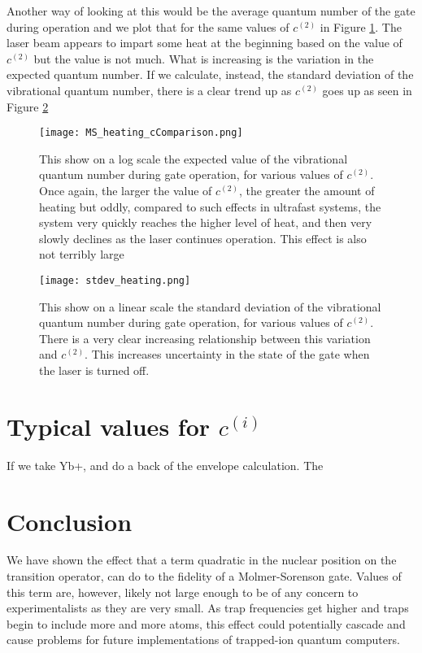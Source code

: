 Another way of looking at this would be the average quantum number of the gate during operation and we plot that for the same values of  $c^{(2)}$ in Figure \ref{fig:MS_heating_cComparison}.  The laser beam appears to impart some heat at the beginning based on the value of $c^{(2)}$ but the value is not much.  What is increasing is the variation in the expected quantum number.  If we calculate, instead, the standard deviation of the vibrational quantum number, there is a clear trend up as $c^{(2)}$ goes up as seen in Figure \ref{fig:MS_heating_stdev}

\begin{figure}
   \texttt{[image: MS\_heating\_cComparison.png]}
   \caption{ This show on a log scale the expected value of the vibrational quantum number during gate operation, for various values of  $c^{(2)}$.  Once again, the larger the value of  $c^{(2)}$, the greater the amount of heating but oddly, compared to such effects in ultrafast systems, the system very quickly reaches the higher level of heat, and then very slowly declines as the laser continues operation.  This effect is also not terribly large}
	\label{fig:MS_heating_cComparison}
\end{figure}


\begin{figure}
   \texttt{[image: stdev\_heating.png]}
   \caption{ This show on a linear scale the standard deviation of the vibrational quantum number during gate operation, for various values of  $c^{(2)}$.  There is a very clear increasing relationship between this variation and  $c^{(2)}$.  This increases uncertainty in the state of the gate when the laser is turned off. }
	\label{fig:MS_heating_stdev}
\end{figure}


\section{Typical values for $c^{(i)}$}
If we take Yb+, and do a back of the envelope calculation.  The

\section{Conclusion}
We have shown the effect that a term quadratic in the nuclear position on the transition operator, can do to the fidelity of a Molmer-Sorenson gate.  Values of this term are, however, likely not large enough to be of any concern to experimentalists as they are very small.  As trap frequencies get higher and traps begin to include more and more atoms, this effect could potentially cascade and cause problems for future implementations of trapped-ion quantum computers.


